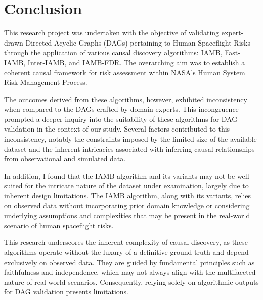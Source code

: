 \documentclass{article}
\begin{document}
\section{Conclusion}
This research project was undertaken with the objective of validating expert-drawn Directed Acyclic Graphs (DAGs) pertaining to Human Spaceflight Risks through the application of various causal discovery algorithms: IAMB, Fast-IAMB, Inter-IAMB, and IAMB-FDR. The overarching aim was to establish a coherent causal framework for risk assessment within NASA's Human System Risk Management Process.

The outcomes derived from these algorithms, however, exhibited inconsistency when compared to the DAGs crafted by domain experts. This incongruence prompted a deeper inquiry into the suitability of these algorithms for DAG validation in the context of our study. Several factors contributed to this inconsistency, notably the constraints imposed by the limited size of the available dataset and the inherent intricacies associated with inferring causal relationships from observational and simulated data.

In addition, I found that the IAMB algorithm and its variants may not be well-suited for the intricate nature of the dataset under examination, largely due to inherent design limitations. The IAMB algorithm, along with its variants, relies on observed data without incorporating prior domain knowledge or considering underlying assumptions and complexities that may be present in the real-world scenario of human spaceflight risks.

This research underscores the inherent complexity of causal discovery, as these algorithms operate without the luxury of a definitive ground truth and depend exclusively on observed data. They are guided by fundamental principles such as faithfulness and independence, which may not always align with the multifaceted nature of real-world scenarios. Consequently, relying solely on algorithmic outputs for DAG validation presents limitations.


\end{document}
